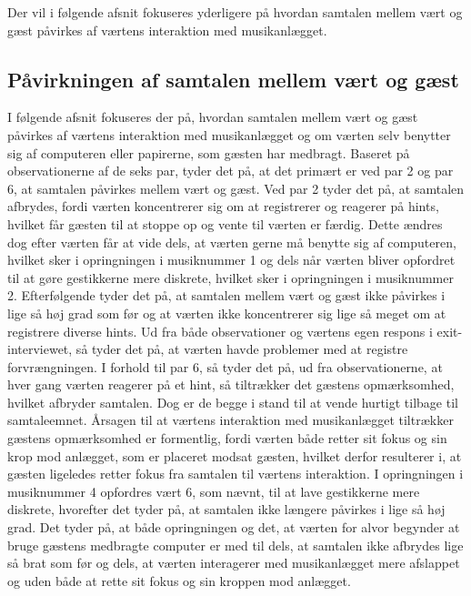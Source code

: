 Der vil i følgende afsnit fokuseres yderligere på hvordan samtalen mellem vært og gæst påvirkes af værtens interaktion med musikanlægget.
%
\subsection{Påvirkningen af samtalen mellem vært og gæst}
\label{TestresultaterSocialAcceptSamtale}
%
I følgende afsnit fokuseres der på, hvordan samtalen mellem vært og gæst påvirkes af værtens interaktion med musikanlægget og om værten selv benytter sig af computeren eller papirerne, som gæsten har medbragt. \blankline
%
Baseret på observationerne af de seks par, tyder det på, at det primært er ved par 2 og par 6, at samtalen påvirkes mellem vært og gæst. Ved par 2 tyder det på, at samtalen afbrydes, fordi værten koncentrerer sig om at registrerer og reagerer på hints, hvilket får gæsten til at stoppe op og vente til værten er færdig. Dette ændres dog efter værten får at vide dels, at værten gerne må benytte sig af computeren, hvilket sker i opringningen i musiknummer 1 og dels når værten bliver opfordret til at gøre gestikkerne mere diskrete, hvilket sker i opringningen i musiknummer 2. Efterfølgende tyder det på, at samtalen mellem vært og gæst ikke påvirkes i lige så høj grad som før og at værten ikke koncentrerer sig lige så meget om at registrere diverse hints. Ud fra både observationer og værtens egen respons i exit-interviewet, så tyder det på, at værten havde problemer med at registre forvrængningen. I forhold til par 6, så tyder det på, ud fra observationerne, at hver gang værten reagerer på et hint, så tiltrækker det gæstens opmærksomhed, hvilket afbryder samtalen. Dog er de begge i stand til at vende hurtigt tilbage til samtaleemnet. Årsagen til at værtens interaktion med musikanlægget tiltrækker gæstens opmærksomhed er formentlig, fordi værten både retter sit fokus og sin krop mod anlægget, som er placeret modsat gæsten, hvilket derfor resulterer i, at gæsten ligeledes retter fokus fra samtalen til værtens interaktion. I opringningen i musiknummer 4 opfordres vært 6, som nævnt, til at lave gestikkerne mere diskrete, hvorefter det tyder på, at samtalen ikke længere påvirkes i lige så høj grad. Det tyder på, at både opringningen og det, at værten for alvor begynder at bruge gæstens medbragte computer er med til dels, at samtalen ikke afbrydes lige så brat som før og dels, at værten interagerer med musikanlægget mere afslappet og uden både at rette sit fokus og sin kroppen mod anlægget.

